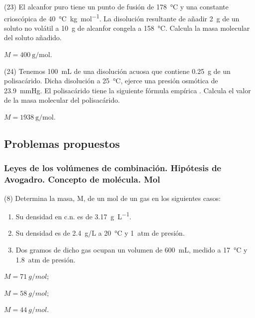 \documentclass[10pt]{article}
\begin{document}
\begin{multicols}{2}
\begin{exercise}
  (23) El alcanfor puro tiene un punto de fusión de \SI{178}{\celsius} y una constante crioscópica de \SI{40}{\celsius\kilo\gram\per\mole}. La disolución resultante de añadir \SI{2}{\gram} de un soluto no volátil a
  \SI{10}{\gram} de alcanfor congela a \SI{158}{\celsius}. Calcula la masa molecular del soluto añadido.
\end{exercise}
\begin{solution}
  \( M = \SI{400}{\gram\per\mole} \).
\end{solution}

\begin{exercise}
  (24) Tenemos \SI{100}{\milli\liter} de una disolución acuosa que contiene \SI{0.25}{\gram} de un polisacárido. Dicha disolución a \SI{25}{\celsius}, ejerce una presión osmótica de \SI{23.9}{\mmHg}. El polisacárido tiene la siguiente fórmula empírica . Calcula el valor de la masa molecular del polisacárido.
\end{exercise}
\begin{solution}
  \( M = \SI{1938}{\gram\per\mole} \).
\end{solution}



\subsection{Problemas propuestos}

\subsubsection{Leyes de los volúmenes de combinación. Hipótesis de Avogadro. Concepto de molécula. Mol}

\begin{exercise}
  (8) Determina la masa, M, de un mol de un gas en los siguientes
  casos:
  \begin{enumerate}
    \item Su densidad en c.n. es de \SI{3.17}{\gram\per\liter}.
    \item Su densidad es de \SI{2.4}{g/L} a \SI{20}{\celsius} y \SI{1}{atm} de presión.
    \item Dos gramos de dicho gas ocupan un volumen de \SI{600}{\milli\liter}, medido a \SI{17}{\celsius} y \SI{1.8}{atm} de presión.
  \end{enumerate}
\end{exercise}
\begin{solution}
  \begin{enumerate*}
    \item \( M = \SI{71}{g/mol} \);
    \item \( M = \SI{58}{g/mol} \);
    \item \( M = \SI{44}{g/mol} \).
    \end{enumerate*}
\end{solution}


\end{multicols}
\end{document}
